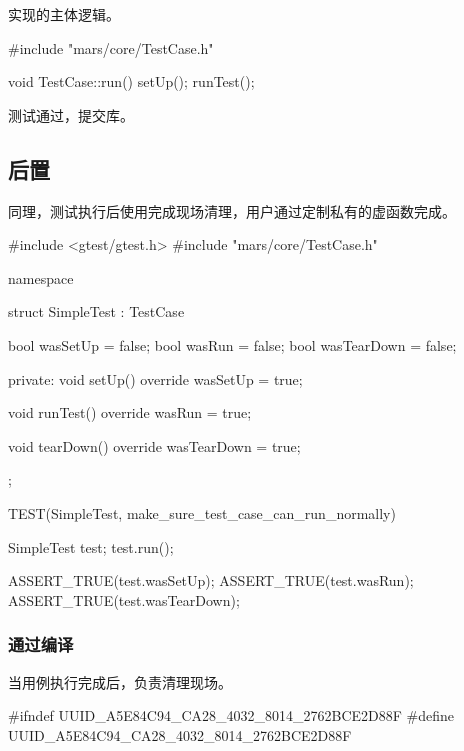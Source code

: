 \begin{content}
实现的主体逻辑。

\begin{leftbar}
 \begin{c++}[caption={\ttfamily{src/mars/core/TestCase.cc}}]
#include "mars/core/TestCase.h"

void TestCase::run() {
  setUp();
  runTest();
}

 \end{c++}
\end{leftbar}

测试通过，提交库。

\subsection{后置}

同理，测试执行后使用完成现场清理，用户通过定制私有的虚函数完成。

\begin{leftbar}
 \begin{c++}[caption={\ttfamily{test/mars/core/TestCaseSpec.cc}}]
#include <gtest/gtest.h>
#include "mars/core/TestCase.h"

namespace {
  struct SimpleTest : TestCase {
    bool wasSetUp = false;
    bool wasRun = false;
    bool wasTearDown = false;

  private:
    void setUp() override {
      wasSetUp = true;
    }

    void runTest() override {
      wasRun = true;
    }

    void tearDown() override {
      wasTearDown = true;
    }
  };
}

TEST(SimpleTest, make_sure_test_case_can_run_normally) {
  SimpleTest test;
  test.run();

  ASSERT_TRUE(test.wasSetUp);
  ASSERT_TRUE(test.wasRun);
  ASSERT_TRUE(test.wasTearDown);  
}
 \end{c++}
\end{leftbar}

\subsubsection{通过编译}

当用例执行完成后，负责清理现场。

\begin{leftbar}
 \begin{c++}[caption={\ttfamily{include/mars/core/TestCase.h}}]
#ifndef UUID_A5E84C94_CA28_4032_8014_2762BCE2D88F
#define UUID_A5E84C94_CA28_4032_8014_2762BCE2D88F


\end{c++}
\end{leftbar}
\end{content}
